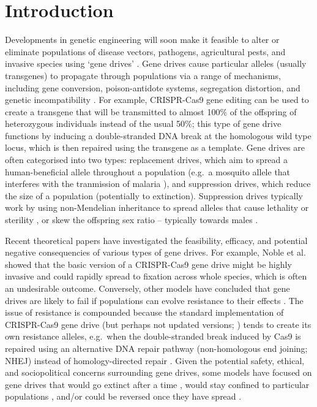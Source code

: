\documentclass[]{rsos}%
\begin{document}
\hypertarget{introduction}{%
\section{Introduction}\label{introduction}}

Developments in genetic engineering will soon make it feasible to alter
or eliminate populations of disease vectors, pathogens, agricultural
pests, and invasive species using `gene drives'
\citep{gantz2015hi, hammond2016cr, wang2016cr, prowse2017do, kyrou2018cr, noble2018cu}.
Gene drives cause particular alleles (usually transgenes) to propagate
through populations via a range of mechanisms, including gene
conversion, poison-antidote systems, segregation distortion, and genetic
incompatibility \citep{lindholm2016ec, champer2016ch, oberhofer2019cl}.
For example, CRISPR-Cas9 gene editing can be used to create a transgene
that will be transmitted to almost 100\% of the offspring of
heterozygous individuals instead of the usual 50\%; this type of gene
drive functions by inducing a double-stranded DNA break at the
homologous wild type locus, which is then repaired using the transgene
as a template. Gene drives are often categorised into two types:
replacement drives, which aim to spread a human-beneficial allele
throughout a population (e.g.~a mosquito allele that interferes with the
tranmission of malaria \citep{gantz2015hi, marshall2015gene}), and
suppression drives, which reduce the size of a population (potentially
to extinction). Suppression drives typically work by using non-Mendelian
inheritance to spread alleles that cause lethality or sterility
\citep{hammond2016cr, kyrou2018cr, maselko2018ge}, or skew the offspring
sex ratio -- typically towards males
\citep{windbichler2008ta, galizi2014sy, beaghton2017ve, burt2018se, papathanos2018re}.

Recent theoretical papers have investigated the feasibility, efficacy,
and potential negative consequencies of various types of gene drives.
For example, Noble et al. \citep{noble2018cu} showed that the basic
version of a CRISPR-Cas9 gene drive might be highly invasive and could
rapidly spread to fixation across whole species, which is often an
undesirable outcome. Conversely, other models have concluded that gene
drives are likely to fail if populations can evolve resistance to their
effects \citep{drury2017cr, unckless2017ev}. The issue of resistance is
compounded because the standard implementation of CRISPR-Cas9 gene drive
(but perhaps not updated versions;
\citep{esvelt2014em, unckless2017ev, prowse2017do, kyrou2018cr}) tends
to create its own resistance alleles, e.g.~when the double-stranded
break induced by Cas9 is repaired using an alternative DNA repair
pathway (non-homologous end joining; NHEJ) instead of homology-directed
repair
\citep{gantz2015mu, gantz2015hi, hammond2016cr, wang2016cr, unckless2017ev}.
Given the potential safety, ethical, and sociopolitical concerns
surrounding gene drives, some models have focused on gene drives that
would go extinct after a time
\citep{min2017da, burt2018se, noble2019da}, would stay confined to
particular populations \citep{maselko2018ge, noble2019da}, and/or could
be reversed once they have spread \citep{vella2017ev}.
\end{document}
